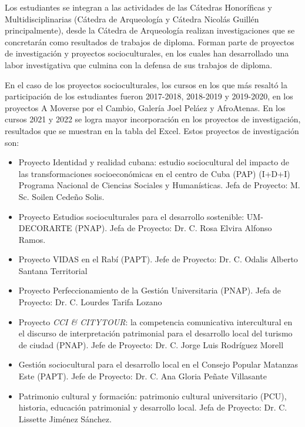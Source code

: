 Los estudiantes se integran a las actividades de las Cátedras Honoríficas y Multidisciplinarias (Cátedra de Arqueología y Cátedra Nicolás Guillén principalmente), desde la Cátedra de Arqueología realizan investigaciones que se concretarán como resultados de trabajos de diploma. Forman parte de proyectos de investigación y proyectos socioculturales, en los cuales han desarrollado una labor investigativa que culmina con la defensa de sus trabajos de diploma.

En el caso de los proyectos socioculturales, los cursos en los que más resaltó la participación de los estudiantes fueron 2017-2018, 2018-2019 y 2019-2020, en los proyectos A Moverse por el Cambio, Galería Joel Peláez y AfroAtenas. En los cursos 2021 y 2022 se logra mayor incorporación en los proyectos de investigación, resultados que se muestran en la tabla del Excel. Estos proyectos de investigación son: 

\begin{itemize}
	\setlength\itemsep{-0.5em}
	\item Proyecto Identidad y realidad cubana: estudio sociocultural del impacto de las transformaciones socioeconómicas en el centro de Cuba (PAP) (I+D+I) Programa Nacional de Ciencias Sociales y Humanísticas. Jefa de Proyecto: M. Sc. Soilen Cedeño Solis. 
	\item Proyecto Estudios socioculturales para el desarrollo sostenible: UM-DECORARTE (PNAP). Jefa de Proyecto: Dr. C. Rosa Elvira Alfonso Ramos.
	\item Proyecto VIDAS en el Rabí (PAPT). Jefe de Proyecto: Dr. C. Odalis Alberto Santana Territorial
	\item Proyecto Perfeccionamiento de la Gestión Universitaria (PNAP). Jefa de Proyecto: Dr. C. Lourdes Tarifa Lozano 
	\item Proyecto \emph{CCI \& CITYTOUR}:  la competencia comunicativa intercultural en el discurso de interpretación patrimonial para el desarrollo local del turismo de ciudad (PNAP). Jefe de Proyecto: Dr. C. Jorge Luis Rodríguez Morell 
	\item Gestión sociocultural para el desarrollo local en el Consejo Popular Matanzas Este (PAPT). Jefe de Proyecto: Dr. C. Ana Gloria Peñate Villasante
	\item Patrimonio cultural y formación: patrimonio cultural universitario (PCU), historia, educación patrimonial y desarrollo local. Jefa de Proyecto: Dr. C. Lissette Jiménez Sánchez.
\end{itemize}


